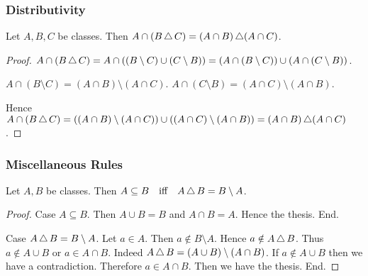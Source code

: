 \documentclass[10pt]{article}
\begin{document}
  \subsubsection*{Distributivity}

  \begin{forthel}
    \begin{proposition}
      Let $A, B, C$ be classes.
      Then $A \cap (B \mathop{\triangle} C) = (A \cap B) \mathop{\triangle} (A \cap C)$.
    \end{proposition}
    \begin{proof}
      $A \cap (B \mathop{\triangle} C)
        = A \cap ((B \setminus C) \cup (C \setminus B))
        = (A \cap (B \setminus C)) \cup (A \cap (C \setminus B))$.

      $A \cap (B \setminus C) = (A \cap B) \setminus (A \cap C)$.
      $A \cap (C \setminus B) = (A \cap C) \setminus (A \cap B)$.

      Hence $A \cap (B \mathop{\triangle} C)
        = ((A \cap B) \setminus (A \cap C)) \cup ((A \cap C) \setminus (A \cap B))
        = (A \cap B) \mathop{\triangle} (A \cap C)$.
    \end{proof}
  \end{forthel}


  \subsubsection*{Miscellaneous Rules}

  \begin{forthel}
    \begin{proposition}
      Let $A, B$ be classes.
      Then $A \subseteq B \quad \text{iff} \quad A \mathop{\triangle} B = B \setminus A$.
    \end{proposition}
    \begin{proof}
      Case $A \subseteq B$.
        Then $A \cup B = B$ and $A \cap B = A$.
        Hence the thesis.
      End.

      Case $A \mathop{\triangle} B = B \setminus A$.
        Let $a \in A$.
        Then $a \notin B \setminus A$.
        Hence $a \notin A \mathop{\triangle} B$.
        Thus $a \notin A \cup B$ or $a \in A \cap B$.
        Indeed $A \mathop{\triangle} B = (A \cup B) \setminus (A \cap B)$.
        If $a \notin A \cup B$ then we have a contradiction.
        Therefore $a \in A \cap B$.
        Then we have the thesis.
      End.
    \end{proof}
  \end{forthel}
\end{document}
